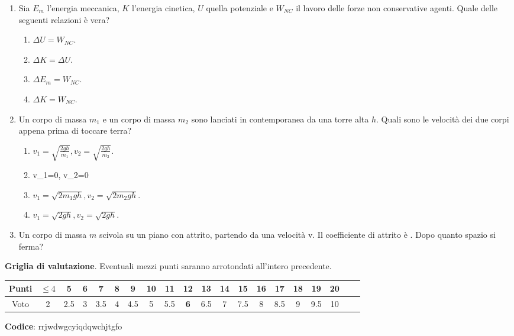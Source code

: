 \documentclass{article}
\begin{document}
\begin{enumerate}
  \item Sia $E_m$ l'energia meccanica, $K$ l'energia cinetica, $U$ quella potenziale e $W_{NC}$ il lavoro delle forze non conservative agenti. Quale delle seguenti relazioni è vera?
  \begin{enumerate}[label=\Alph*.]
    \item $\Delta U=W_{NC}$.
    \item $\Delta K = \Delta U$.
    \item $\Delta E_m=W_{NC}$.
    \item $\Delta K=W_{NC}.$
  \end{enumerate}
  \item Un corpo di massa $m_1$ e un corpo di massa $m_2$ sono lanciati in contemporanea da una torre alta $h$. Quali sono le velocità dei due corpi appena prima di toccare terra?
  \begin{enumerate}[label=\Alph*.]
    \item $v_1=\sqrt{\frac{2gh}{m_1}}, v_2=\sqrt{\frac{2gh}{m_2}}$.
    \item v_1=0, v_2=0
    \item $v_1=\sqrt{2m_1gh}, v_2=\sqrt{2m_2gh}$.
    \item $v_1=\sqrt{2gh}, v_2=\sqrt{2gh}$.
  \end{enumerate}
  \item Un corpo di massa $m$ scivola su un piano con attrito, partendo da una velocità v. Il coefficiente di attrito è \mu. Dopo quanto spazio si ferma?
  \begin{enumerate}[label=\Alph*.]
    \item $\frac{1}{2}v^2+\mu g$.
    \item $\frac{2v^2}{g\mu}}$.
    \item $\frac{1}{2}v^2-\mu g$.
    \item $\frac{v^2}{2g\mu}}$.
  \end{enumerate}
\end{enumerate}








\newpage \maketitle \centering \textbf{Griglia di valutazione}. Eventuali mezzi punti saranno arrotondati all'intero precedente. \begin{table}[h]     \centering \begin{tabular}{|c|c|c|c|c|c|c|c|c|c|c|c|c|c|c|c|c|c|c|c|} \hline Punti &  $\leq 4$ & 5 & 6 & 7 & 8 & 9 & 10 & 11 & \textbf{12} & 13 & 14 & 15 & 16 & 17 & 18 & 19 & 20 \\ \hline Voto & 2 & 2.5 & 3 & 3.5 & 4 & 4.5 & 5 & 5.5 & \textbf{6} & 6.5 & 7 & 7.5 & 8 & 8.5 & 9 & 9.5 & 10 \\ \hline \end{tabular} \end{table}
\textbf{Codice}: rrjwdwgcyiqdqwchjtgfo
\end{document}
